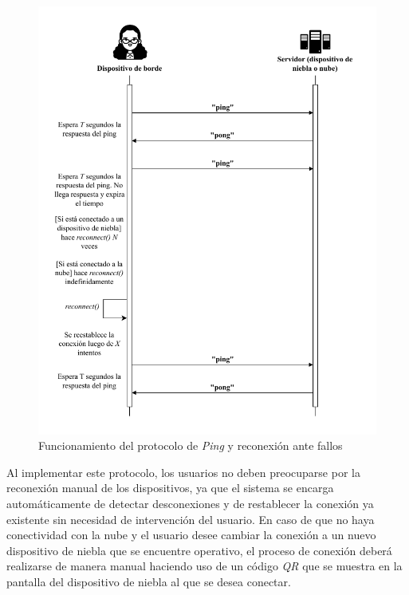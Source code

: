 \begin{figure}
    \centering
    \includegraphics[width=14cm]{Imagenes/Implementacion/ProtocoloReconexion.pdf}
    \caption{Funcionamiento del protocolo de \textit{Ping} y reconexión ante fallos}
    \label{fig:protocoloReconexion}
\end{figure}


Al implementar este protocolo, los usuarios no deben preocuparse por la reconexión manual de los dispositivos, ya que el sistema se encarga automáticamente de detectar desconexiones y de restablecer la conexión ya existente sin necesidad de intervención del usuario. En caso de que no haya conectividad con la nube y el usuario desee cambiar la conexión a un nuevo dispositivo de niebla que se encuentre operativo, el proceso de conexión deberá realizarse de manera manual haciendo uso de un código \textit{QR} que se muestra en la pantalla del dispositivo de niebla al que se desea conectar.

